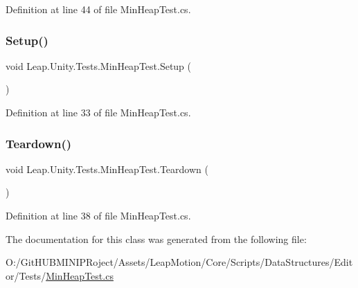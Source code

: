 Definition at line 44 of file Min\+Heap\+Test.\+cs.

\mbox{\label{class_leap_1_1_unity_1_1_tests_1_1_min_heap_test_ab0fdc557c659de1134fbb10b18b884a4}} 
\subsubsection{\texorpdfstring{Setup()}{Setup()}}
{\footnotesize\ttfamily void Leap.\+Unity.\+Tests.\+Min\+Heap\+Test.\+Setup (\begin{DoxyParamCaption}{ }\end{DoxyParamCaption})}



Definition at line 33 of file Min\+Heap\+Test.\+cs.

\mbox{\label{class_leap_1_1_unity_1_1_tests_1_1_min_heap_test_a2999b9ca314a777ce8711cfd2104d209}} 
\subsubsection{\texorpdfstring{Teardown()}{Teardown()}}
{\footnotesize\ttfamily void Leap.\+Unity.\+Tests.\+Min\+Heap\+Test.\+Teardown (\begin{DoxyParamCaption}{ }\end{DoxyParamCaption})}



Definition at line 38 of file Min\+Heap\+Test.\+cs.



The documentation for this class was generated from the following file\+:\begin{DoxyCompactItemize}
\item 
O\+:/\+Git\+H\+U\+B\+M\+I\+N\+I\+P\+Roject/\+Assets/\+Leap\+Motion/\+Core/\+Scripts/\+Data\+Structures/\+Editor/\+Tests/\mbox{\hyperlink{_min_heap_test_8cs}{Min\+Heap\+Test.\+cs}}\end{DoxyCompactItemize}
